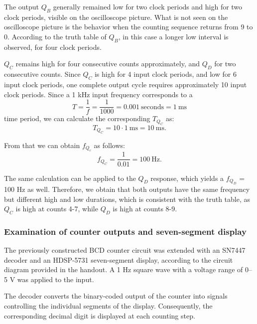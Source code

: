 \documentclass[12pt]{article}
\begin{document}
The output $Q_B$ generally remained low for two clock periods and high for two clock periods, visible on the oscilloscope picture. What is not seen on the oscilloscope picture is the behavior when the counting sequence returns from 9 to 0. According to the truth table of $Q_B$, in this case a longer low interval is observed, for four clock periods.

$Q_C$ remains high for four consecutive counts approximately, and $Q_D$ for two consecutive counts. Since $Q_C$ is high for 4 input clock periods, and low for 6 input clock periods, one complete output cycle requires approximately 10 input clock periods. Since a 1 kHz input frequency corresponds to a
\begin{equation}
    T = \frac{1}{f}=\frac{1}{1000}=0.001 ~\mathrm{seconds} = 1 ~\mathrm{ms}
\end{equation}
time period, we can calculate the corresponding $T_{Q_C}$ as:
\begin{equation}
    T_{Q_C}=10 \cdot 1 ~\mathrm{ms} = 10 ~\mathrm{ms}.
\end{equation}

From that we can obtain $f_{Q_c}$ as follows:
\begin{equation}
    f_{Q_C} = \frac{1}{0.01}=100 ~\mathrm{Hz}.
\end{equation}

The same calculation can be applied to the $Q_D$ response, which yields a $f_{Q_D}$ = 100 Hz as well. Therefore, we obtain that both outputs have the same frequency but different high and low durations, which is consistent with the truth table, as $Q_C$ is high at counts 4-7, while $Q_D$ is high at counts 8-9.  

\subsubsection{Examination of counter outputs and seven-segment display}
The previously constructed BCD counter circuit was extended with an SN7447 decoder and an HDSP-5731 seven-segment display, according to the circuit diagram provided in the handout. A 1 Hz square wave with a voltage range of 0--5 V was applied to the input. 

The decoder converts the binary-coded output of the counter into signals controlling the individual segments of the display. Consequently, the corresponding decimal digit is displayed at each counting step.
\end{document}
